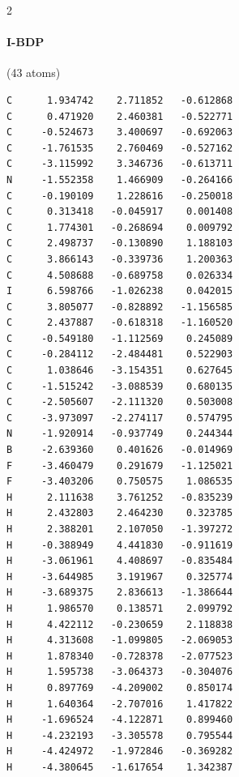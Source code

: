 \begin{multicols}{2}
\paragraph{I-BDP} (43 atoms)
{\scriptsize\linespread{1}\selectfont\begin{verbatim}
C      1.934742    2.711852   -0.612868
C      0.471920    2.460381   -0.522771
C     -0.524673    3.400697   -0.692063
C     -1.761535    2.760469   -0.527162
C     -3.115992    3.346736   -0.613711
N     -1.552358    1.466909   -0.264166
C     -0.190109    1.228616   -0.250018
C      0.313418   -0.045917    0.001408
C      1.774301   -0.268694    0.009792
C      2.498737   -0.130890    1.188103
C      3.866143   -0.339736    1.200363
C      4.508688   -0.689758    0.026334
I      6.598766   -1.026238    0.042015
C      3.805077   -0.828892   -1.156585
C      2.437887   -0.618318   -1.160520
C     -0.549180   -1.112569    0.245089
C     -0.284112   -2.484481    0.522903
C      1.038646   -3.154351    0.627645
C     -1.515242   -3.088539    0.680135
C     -2.505607   -2.111320    0.503008
C     -3.973097   -2.274117    0.574795
N     -1.920914   -0.937749    0.244344
B     -2.639360    0.401626   -0.014969
F     -3.460479    0.291679   -1.125021
F     -3.403206    0.750575    1.086535
H      2.111638    3.761252   -0.835239
H      2.432803    2.464230    0.323785
H      2.388201    2.107050   -1.397272
H     -0.388949    4.441830   -0.911619
H     -3.061961    4.408697   -0.835484
H     -3.644985    3.191967    0.325774
H     -3.689375    2.836613   -1.386644
H      1.986570    0.138571    2.099792
H      4.422112   -0.230659    2.118838
H      4.313608   -1.099805   -2.069053
H      1.878340   -0.728378   -2.077523
H      1.595738   -3.064373   -0.304076
H      0.897769   -4.209002    0.850174
H      1.640364   -2.707016    1.417822
H     -1.696524   -4.122871    0.899460
H     -4.232193   -3.305578    0.795544
H     -4.424972   -1.972846   -0.369282
H     -4.380645   -1.617654    1.342387
\end{verbatim}}

\end{multicols}
